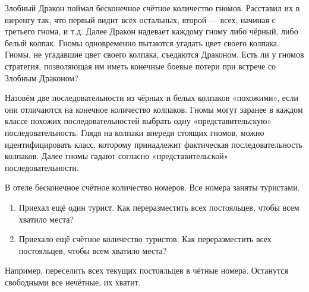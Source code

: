 \begin{problem}
Злобный Дракон поймал бесконечное счётное количество гномов. Расставил их в шеренгу так, что первый видит всех остальных, второй — всех, начиная с третьего гнома, и т.д. Далее Дракон надевает каждому гному либо чёрный, либо белый колпак. Гномы одновременно пытаются угадать цвет своего колпака. Гномы, не угадавшие цвет своего колпака, съедаются Драконом. Есть ли у гномов стратегия, позволяющая им иметь конечные боевые потери при встрече со Злобным Драконом?

\begin{sol}
Назовём две последовательности из чёрных и белых колпаков «похожими», если они отличаются на конечное количество колпаков. Гномы могут заранее в каждом классе похожих последовательностей выбрать одну «представительскую» последовательность. Глядя на колпаки впереди стоящих гномов, можно идентифицировать класс, которому принадлежит фактическая последовательность колпаков. Далее гномы гадают согласно «представительской» последовательности.
\end{sol}
\end{problem}


\begin{problem}
В отеле бесконечное счётное количество номеров. Все номера заняты туристами.
\begin{enumerate}
\item Приехал ещё один турист. Как переразместить всех постояльцев, чтобы всем хватило места?
\item Приехало ещё счётное количество туристов. Как переразместить всех постояльцев, чтобы всем хватило места?
\end{enumerate}

\begin{sol}
Например, переселить всех текущих постояльцев в чётные номера. Останутся свободными все нечётные, их хватит.
\end{sol}
\end{problem}


